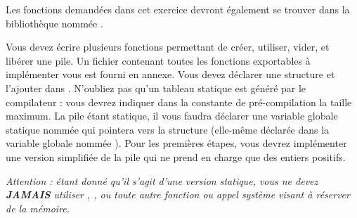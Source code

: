 

\vspace*{0.7cm}

\noindent {}

\bigskip

\noindent Les fonctions demandées dans cet exercice devront également se trouver dans la bibliothèque nommée .

\bigskip

\noindent Vous devez écrire plusieurs fonctions permettant de créer, utiliser, vider, et libérer une pile.
Un fichier  contenant toutes les fonctions exportables à implémenter vous est fourni en annexe.
Vous devez déclarer une structure  et l'ajouter dans .
N'oubliez pas qu'un tableau statique est généré par le compilateur : vous devrez indiquer dans la constante de pré-compilation  la taille maximum.
La pile étant statique, il vous faudra déclarer une variable globale statique nommée  qui pointera vers la structure (elle-même déclarée dans la variable globale nommée ).
Pour les premières étapes, vous devrez implémenter une version simplifiée de la pile qui ne prend en charge que des entiers positifs.

\noindent \textit{Attention : étant donné qu'il s'agit d'une version statique, vous ne devez \textbf{JAMAIS} utiliser , , ou toute autre fonction ou appel système visant à réserver de la mémoire.}

